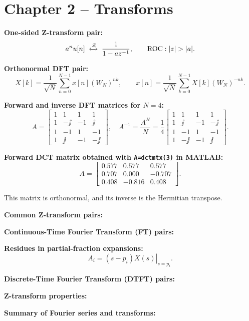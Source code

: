 \section*{Chapter 2 -- Transforms}

\textbf{One-sided Z-transform pair:}
\[
a^n u[n]
\;
\xleftrightarrow{\mathcal{Z}}
\;
\frac{1}{1-a z^{-1}},
\qquad
\mathrm{ROC}: |z|>|a|.
\]

\textbf{Orthonormal DFT pair:}
\[
X[k]=\frac{1}{\sqrt{N}}
\sum_{n=0}^{N-1}x[n](W_N)^{nk},
\qquad
x[n]=\frac{1}{\sqrt{N}}
\sum_{k=0}^{N-1}X[k](W_N)^{-nk}.
\]

\textbf{Forward and inverse DFT matrices for $N=4$:}
\[
A=
\begin{bmatrix}
1&1&1&1\\
1&-\jj&-1&\jj\\
1&-1&1&-1\\
1&\jj&-1&-\jj
\end{bmatrix},
\quad
A^{-1}=\frac{A^H}{N}
=
\frac{1}{4}
\begin{bmatrix}
1&1&1&1\\
1&\jj&-1&-\jj\\
1&-1&1&-1\\
1&-\jj&-1&\jj
\end{bmatrix}.
\]

\textbf{Forward DCT matrix obtained with \texttt{A=dctmtx(3)} in MATLAB:}
\[
A=
\begin{bmatrix}
0.577&0.577&0.577\\
0.707&0.000&-0.707\\
0.408&-0.816&0.408
\end{bmatrix}.
\]

This matrix is orthonormal, and its inverse is the Hermitian transpose.

\textbf{Common Z-transform pairs:}

\textbf{Continuous-Time Fourier Transform (FT) pairs:}

\textbf{Residues in partial-fraction expansions:}
\[
A_i=
\left.
(s-p_i)X(s)
\right|_{s=p_i}.
\]


\textbf{Discrete-Time Fourier Transform (DTFT) pairs:}

\textbf{Z-transform properties:}

\textbf{Summary of Fourier series and transforms:}
